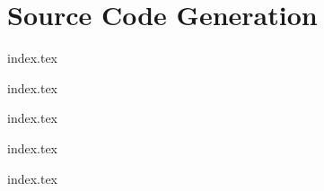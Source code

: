 
\section{Source Code Generation}
{
	\lipsum[1]
	
	{index.tex}
	
	{index.tex}
	
	{index.tex}
	
	{index.tex}
	
	{index.tex}
}

